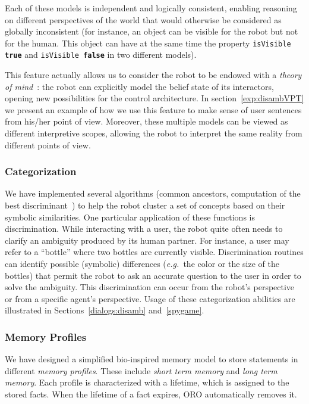 \documentclass{svmult}
\newcommand{\concept}[1]{{\footnotesize \texttt{#1}}}
\newcommand{\eg}{{\textit{e.g.~}}}
\begin{document}
Each of these models is independent and logically consistent,
enabling reasoning on different perspectives of the world that would otherwise
be considered as globally inconsistent (for instance, an object can be visible for the
robot but not for the human. This object can have at the same time the property
\concept{isVisible \textbf{true}} and \concept{isVisible \textbf{false}} in
two different models). 

This feature actually allows us to consider the robot to be endowed with a
\emph{theory of mind}~\cite{Scassellati2002}: the robot can explicitly model
the belief state of its interactors, opening new possibilities for the control
architecture. In section~\ref{exp:disambVPT} we present an example of how we use this feature to
make sense of user sentences from his/her point of view. Moreover,
these multiple models can be viewed as different interpretive scopes,
allowing the robot to interpret the same reality from different points of view.

\subsubsection{Categorization}
\label{categorization}

We have implemented several algorithms (common ancestors, computation of the
best discriminant~\cite{Ros2010b}) to help the robot cluster a set of
concepts based on their symbolic similarities. One particular application of these functions is discrimination.
While interacting with a user, the robot quite often needs to clarify an
ambiguity produced by its human partner. For instance, a user may refer to a
``bottle'' where two bottles are currently visible. Discrimination routines
can identify possible (symbolic) differences (\eg the color or the size of the
bottles) that permit the robot to ask an accurate question to the user in order
to solve the ambiguity. This discrimination can occur from the robot's
perspective or from a specific agent's perspective. Usage of these
categorization abilities are illustrated in Sections~\ref{dialogs:disamb} and~\ref{spygame}.

\subsubsection{Memory Profiles}
\label{memory}

We have designed a simplified bio-inspired memory model to store
statements in different \emph{memory profiles}. These include \emph{short term
memory} and \emph{long term memory}. Each profile is characterized with a
lifetime, which is assigned to the stored facts. When the lifetime of a fact
expires, ORO automatically removes it.
\end{document}
